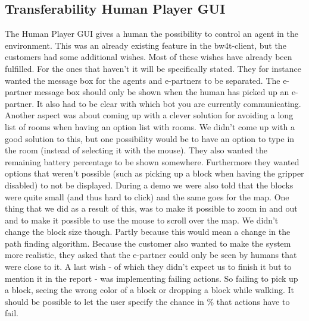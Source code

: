 \documentclass[a4paper]{article}
\begin{document}
\subsection*{Transferability Human Player GUI}

The Human Player GUI gives a human the possibility to control an agent in the environment. This was an already existing feature in the bw4t-client, but the customers had some additional wishes.
Most of these wishes have already been fulfilled. For the ones that haven't it will be specifically stated. They for instance wanted the message box for the agents and e-partners to be separated. The e-partner message box should only be shown when the human has picked up an e-partner. It also had to be clear with which bot you are currently communicating.
Another aspect was about coming up with a clever solution for avoiding a long list of rooms when having an option list with rooms. We didn't come up with a good solution to this, but one possibility would be to have an option to type in the room (instead of selecting it with the mouse).
They also wanted the remaining battery percentage to be shown somewhere. Furthermore they wanted options that weren't possible (such as picking up a block when having the gripper disabled) to not be displayed. During a demo we were also told that the blocks were quite small (and thus hard to click) and the same goes for the map. One thing that we did as a result of this, was to make it possible to zoom in and out and to make it possible to use the mouse to scroll over the map. We didn't change the block size though. Partly because this would mean a change in the path finding algorithm.
Because the customer also wanted to make the system more realistic, they asked that the e-partner could only be seen by humans that were close to it.
A last wish - of which they didn't expect us to finish it but to mention it in the report - was implementing failing actions. So failing to pick up a block, seeing the wrong color of a block or dropping a block while walking. It should be possible to let the user specify the chance in \% that actions have to fail.
\end{document}
